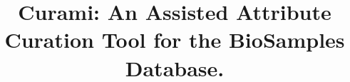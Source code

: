 \documentclass{bmcart}
\begin{document}
\begin{frontmatter}

\begin{fmbox}


\title{Curami: An Assisted Attribute Curation Tool for the BioSamples Database.}


\author[
   addressref={aff1},                   %
   corref={aff1},                       %
   noteref={n1},                        %
   email={hewgreen@ebi.co.uk}   %
]{\inits{} }
 

\address[id=aff1]{%
  ,
  ,
  ,
}



\end{fmbox}
\end{frontmatter}
\end{document}
